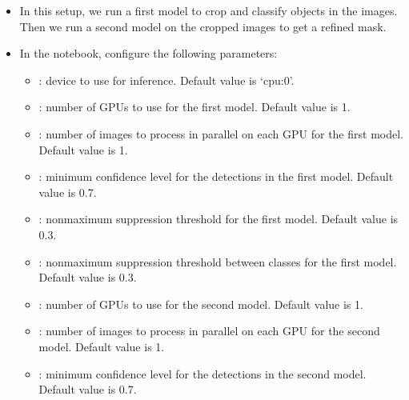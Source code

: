 \documentclass[letterpaper,10pt,english]{sphinxmanual}
\begin{document}
\label{\detokenize{index:full-pipeline}}\begin{itemize}
\item {} 
\sphinxAtStartPar
In this setup, we run a first model to crop and classify objects in the images. Then we run a second model on the cropped images to get a refined mask.

\item {} 
\sphinxAtStartPar
In the  notebook, configure the following parameters:
\begin{itemize}
\item {} 
\sphinxAtStartPar
{}: device to use for inference. Default value is ‘cpu:0’.

\item {} 
\sphinxAtStartPar
{}: number of GPUs to use for the first model. Default value is 1.

\item {} 
\sphinxAtStartPar
{}: number of images to process in parallel on each GPU for the first model. Default value is 1.

\item {} 
\sphinxAtStartPar
{}: minimum confidence level for the detections in the first model. Default value is 0.7.

\item {} 
\sphinxAtStartPar
{}: non\sphinxhyphen{}maximum suppression threshold for the first model. Default value is 0.3.

\item {} 
\sphinxAtStartPar
{}: non\sphinxhyphen{}maximum suppression threshold between classes for the first model. Default value is 0.3.

\item {} 
\sphinxAtStartPar
{}: number of GPUs to use for the second model. Default value is 1.

\item {} 
\sphinxAtStartPar
{}: number of images to process in parallel on each GPU for the second model. Default value is 1.

\item {} 
\sphinxAtStartPar
{}: minimum confidence level for the detections in the second model. Default value is 0.7.


\end{itemize}
\end{itemize}
\end{document}
